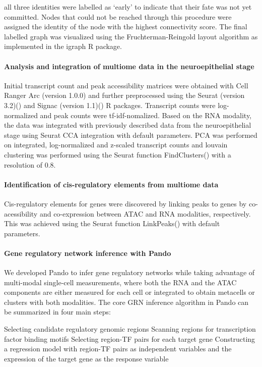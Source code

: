 all three identities were labelled as ‘early’ to indicate that their fate was not yet committed. Nodes that could not be reached through this procedure were assigned the identity of the node with the highest connectivity score. The final labelled graph was visualized using the Fruchterman-Reingold layout algorithm as implemented in the igraph R package.
 
\paragraph{Analysis and integration of multiome data in the neuroepithelial stage}
Initial transcript count and peak accessibility matrices were obtained with Cell Ranger Arc (version 1.0.0) and further preprocessed using the Seurat (version 3.2)(\cite{stuart_comprehensive_2019}) and Signac (version 1.1)(\cite{stuart_multimodal_2020}) R packages. Transcript counts were log-normalized and peak counts were tf-idf-nomalized. Based on the RNA modality, the data was integrated with previously described data from the neuroepithelial stage using Seurat CCA integration with default parameters. PCA was performed on integrated, log-normalized and z-scaled transcript counts and louvain clustering was performed using the Seurat function FindClusters() with a resolution of 0.8.
 
\paragraph{Identification of cis-regulatory elements from multiome data}
Cis-regulatory elements for genes were discovered by linking peaks to genes by co-acessibility and co-expression between ATAC and RNA modalities, respectively. This was achieved using the Seurat function LinkPeaks() with default parameters.
 
\paragraph{Gene regulatory network inference with Pando}
We developed Pando to infer gene regulatory networks while taking advantage of multi-modal single-cell measurements, where both the RNA and the ATAC components are either measured for each cell or integrated to obtain metacells or clusters with both modalities. The core GRN inference algorithm in Pando can be summarized in four main steps:
 
Selecting candidate regulatory genomic regions
Scanning regions for transcription factor binding motifs
Selecting region-TF pairs for each target gene
Constructing a regression model with region-TF pairs as independent variables and the expression of the target gene as the response variable
 

